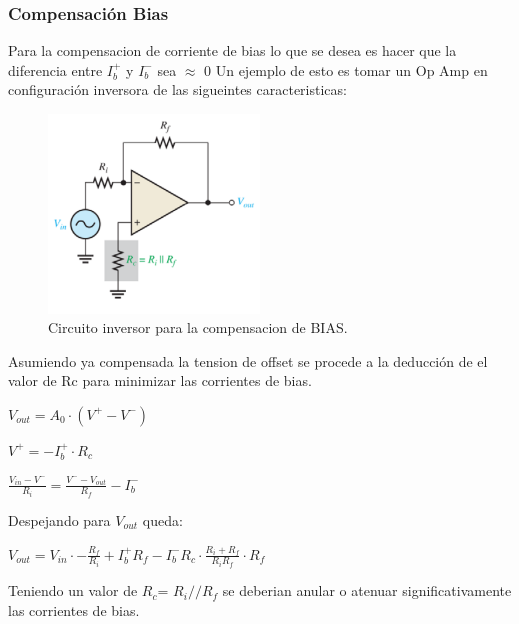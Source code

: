 \subsubsection{Compensación Bias}
Para la compensacion de corriente de bias lo que se desea es hacer que la diferencia entre $I_b^+$ y $I_b^-$ sea $\approx$ 0
Un ejemplo de esto es tomar un Op Amp en configuración inversora  de las sigueintes caracteristicas:
\begin{figure}[H]	
	\centering
	\includegraphics[width=0.5\textwidth]{imagenes/CompensacionBias.PNG}
	\caption{Circuito inversor para la compensacion de BIAS.}
	\label{fig:CompensacionBias}
\end{figure}
Asumiendo ya compensada la tension de offset se procede a la deducción de el valor de Rc para minimizar las corrientes de bias.
\begin{center}$V_{out}=A_0 \cdot (V^+ - V^-)$\\\end{center}
\begin{center}$V^+=-I_b^+ \cdot R_c$\\\end{center}
\begin{center}$\frac{V_{in}-V^-}{R_i}=\frac{V^- - V_{out}}{R_f} -I_b^-$\\\end{center}
Despejando para $V_{out}$ queda:
\begin{center}$V_{out}=V_{in}\cdot -\frac{R_f}{R_i}+I_b^+ R_f-I_b^- R_c \cdot \frac{R_i+R_f}{R_i R_f}\cdot R_f $\\\end{center}
Teniendo un valor de $R_c$= $R_i//R_f$ se deberian anular o atenuar significativamente las corrientes de bias.
